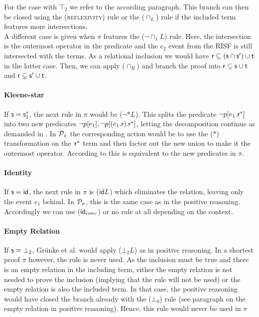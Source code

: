 \documentclass[a4paper,twoside,12pt, english]{article}
\begin{document}
For the case with $\top_2$ we refer to the according paragraph.
This branch can then be closed using the (\textsc{reflexivity}) rule or the ($\cap_L$) rule if the included term features more intersections.   \\
A different case is given when $\pi$ features the ($\neg {\cap_1}L$) rule. \newpage Here, the intersection is the outermost operator in the predicate and the $e_2$ event from the RISF is still intersected with the terms. As a relational inclusion we would have $\textsf{\upshape r} \subseteq (\textsf{\upshape s} \cap \textsf{\upshape s}') \cup \textsf{\upshape t}$ in the latter case. Then, we can apply ($\cap_R$) and branch the proof into $\textsf{\upshape r} \subseteq \textsf{\upshape s} \cup \textsf{\upshape t}$  and $\textsf{\upshape r} \subseteq \textsf{\upshape s}' \cup \textsf{\upshape t}$.


\paragraph{Kleene-star} If $\textsf{\upshape s} = \textsf{\upshape s}_1^*$, the next rule in $\pi$ would be ($\neg *L$). This splits the predicate $\neg p[e_1.\textsf{\upshape r}^*]$ into two new predicates $\neg p[e_1], \neg p[(e_1.\textsf{\upshape r}).\textsf{\upshape r}^*]$, letting the decomposition continue as demanded in . In $\mathcal{P}_\pi$ the corresponding action would be to use the ($*$) transformation on the~$\textsf{\upshape r}^*$ term and then factor out the new union to make it the outermost operator. According to  this is equivalent to the new predicates in $\pi$.

\paragraph{Identity} If $\textsf{\upshape s}=\textsf{\upshape id}$, the next rule in $\pi$ is ($\textsf{\upshape id} L$) which eliminates the \id{} relation, leaving only the event $e_1$ behind.
In $\mathcal{P}_\pi$, this is the same case as in the positive reasoning. Accordingly we can use ($\textsf{\upshape id}_{conc}$) or no rule at all depending on the context.

\paragraph{Empty Relation} If $\textsf{\upshape s}=\bot_2$, Grünke et al. would apply ($\bot_2 L$) as in positive reasoning. In a shortest proof $\pi$ however, the rule is never used. As the inclusion must be true and there is an empty relation in the including term, either the empty relation is not needed to prove the inclusion (implying that the rule will not be used) or the empty relation is also the included term. In that case, the positive reasoning would have closed the branch already with the ($\bot_0$) rule (see paragraph on the empty relation in positive reasoning).
Hence, this rule would never be used in $\pi$
\end{document}
